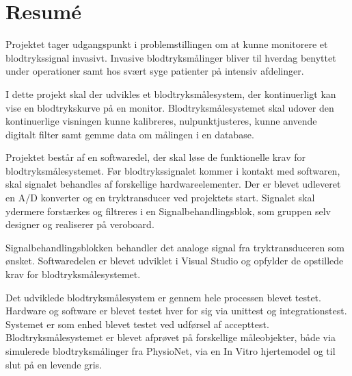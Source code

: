 \chapter{Resumé}
Projektet tager udgangspunkt i problemstillingen om at kunne monitorere et blodtrykssignal invasivt. Invasive blodtryksmålinger bliver til hverdag benyttet under operationer samt hos svært syge patienter på intensiv afdelinger. 

I dette projekt skal der udvikles et blodtryksmålesystem, der kontinuerligt kan vise en blodtrykskurve på en monitor. Blodtryksmålesystemet skal udover den kontinuerlige visningen kunne kalibreres, nulpunktjusteres, kunne anvende digitalt filter samt gemme data om målingen i en database. 

Projektet består af en softwaredel, der skal løse de funktionelle krav for blodtryksmålesystemet. Før blodtrykssignalet kommer i kontakt med softwaren, skal signalet behandles af forskellige hardwareelementer. Der er blevet udleveret en A/D konverter og en tryktransducer ved projektets start. Signalet skal ydermere forstærkes og filtreres i en Signalbehandlingsblok, som gruppen selv designer og realiserer på veroboard.

Signalbehandlingsblokken behandler det analoge signal fra tryktransduceren som ønsket. Softwaredelen er blevet udviklet i Visual Studio og opfylder de opstillede krav for blodtryksmålesystemet. 

Det udviklede blodtryksmålesystem er gennem hele processen blevet testet. Hardware og software er blevet testet hver for sig via unittest og integrationstest. Systemet er som enhed blevet testet ved udførsel af accepttest. Blodtryksmålesystemet er blevet afprøvet på forskellige måleobjekter, både via simulerede blodtryksmålinger fra PhysioNet, via en In Vitro hjertemodel og til slut på en levende gris.